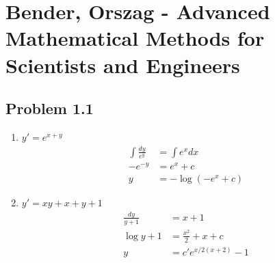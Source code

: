 \documentclass[10pt,a4paper]{book}
\theoremstyle{definition}
\begin{document}
\section{{\sc Bender, Orszag} - Advanced Mathematical Methods for Scientists and Engineers}
\subsection{Problem 1.1}
\begin{enumerate}
    \item $y'=e^{x+y}$
    \begin{align}
        \int\frac{dy}{e^y}&=\int e^xdx\\
        -e^{-y}&=e^x+c\\
        y&=-\log\left(-e^x+c\right)
    \end{align}
    \item $y'=xy+x+y+1$
    \begin{align}
        \frac{dy}{y+1}&=x+1\\
        \log y+1&=\frac{x^2}{2}+x+c\\
        y&=c'e^{x/2(x+2)}-1
    \end{align}
\end{enumerate}
\end{document}
